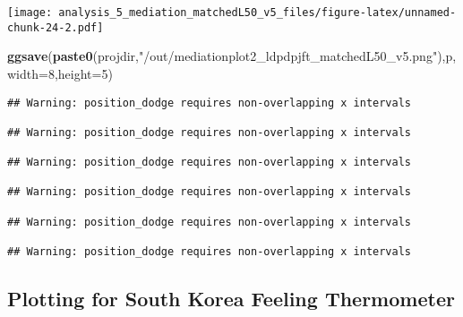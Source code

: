 \documentclass[
]{article}
\newenvironment{Shaded}{\begin{snugshade}}{\end{snugshade}}
\newcommand{\DataTypeTok}[1]{\textcolor[rgb]{0.13,0.29,0.53}{#1}}
\newcommand{\DecValTok}[1]{\textcolor[rgb]{0.00,0.00,0.81}{#1}}
\newcommand{\KeywordTok}[1]{\textcolor[rgb]{0.13,0.29,0.53}{\textbf{#1}}}
\newcommand{\NormalTok}[1]{#1}
\newcommand{\StringTok}[1]{\textcolor[rgb]{0.31,0.60,0.02}{#1}}
\begin{document}
\texttt{[image: analysis\_5\_mediation\_matchedL50\_v5\_files/figure-latex/unnamed-chunk-24-2.pdf]}

\begin{Shaded}
\begin{Highlighting}[]
\KeywordTok{ggsave}\NormalTok{(}\KeywordTok{paste0}\NormalTok{(projdir,}\StringTok{"/out/mediationplot2_ldpdpjft_matchedL50_v5.png"}\NormalTok{),p,}\DataTypeTok{width=}\DecValTok{8}\NormalTok{,}\DataTypeTok{height=}\DecValTok{5}\NormalTok{)}
\end{Highlighting}
\end{Shaded}

\begin{verbatim}
## Warning: position_dodge requires non-overlapping x intervals

## Warning: position_dodge requires non-overlapping x intervals

## Warning: position_dodge requires non-overlapping x intervals

## Warning: position_dodge requires non-overlapping x intervals

## Warning: position_dodge requires non-overlapping x intervals

## Warning: position_dodge requires non-overlapping x intervals
\end{verbatim}

\hypertarget{plotting-for-south-korea-feeling-thermometer}{%
\subsection{Plotting for South Korea Feeling
Thermometer}\label{plotting-for-south-korea-feeling-thermometer}}
\end{document}
